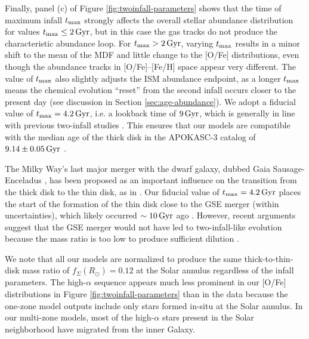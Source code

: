 \documentclass[twocolumn,twocolappendix,linenumbers]{aastex631}
\newcommand{\Gyr}{\,{\rm Gyr}}
\begin{document}
Finally, panel (c) of Figure \ref{fig:twoinfall-parameters} shows that the time of maximum infall $t_{\rm max}$ strongly affects the overall stellar abundance distribution for values $t_{\rm max}\leq2\Gyr$, but in this case the gas tracks do not produce the characteristic abundance loop. For $t_{\rm max}>2\Gyr$, varying $t_{\rm max}$ results in a minor shift to the mean of the MDF and little change to the [O/Fe] distributions, even though the abundance tracks in [O/Fe]--[Fe/H] space appear very different. The value of $t_{\rm max}$ also slightly adjusts the ISM abundance endpoint, as a longer $t_{\rm max}$ means the chemical evolution ``reset'' from the second infall occurs closer to the present day (see discussion in Section \ref{sec:age-abundance}). We adopt a fiducial value of $t_{\rm max}=4.2\Gyr$, i.e. a lookback time of $9\Gyr$, which is generally in line with previous two-infall studies \citep[e.g.,][]{nissen_high-precision_2020,spitoni_galactic_2020,spitoni_apogee_2021,hegedus_reconstructing_2025}. This ensures that our models are compatible with the median age of the thick disk in the APOKASC-3 catalog of $9.14\pm0.05\Gyr$ \citep{pinsonneault_apokasc-3_2025}. 

The Milky Way's last major merger with the dwarf galaxy, dubbed Gaia Sausage-Enceladus \citep[GSE;][]{belokurov_co-formation_2018,helmi_merger_2018}, has been proposed as an important influence on the transition from the thick disk to the thin disk, as in \citet{spitoni_remind_2024}. Our fiducial value of $t_{\rm max}=4.2\Gyr$ places the start of the formation of the thin disk close to the GSE merger (within uncertainties), which likely occurred $\sim10\Gyr$ ago \citep[e.g.,][]{helmi_merger_2018,gallart_uncovering_2019,naidu_reconstructing_2021,woody_rapid_2025}. However, recent arguments suggest that the GSE merger would not have led to two-infall-like evolution because the mass ratio is too low to produce sufficient dilution \citep{orkney_milky_2025}.

We note that all our models are normalized to produce the same thick-to-thin-disk mass ratio of $f_{\Sigma}(R_\odot)=0.12$ \citep{bland-hawthorn_galaxy_2016} at the Solar annulus regardless of the infall parameters. The high-$\alpha$ sequence appears much less prominent in our [O/Fe] distributions in Figure \ref{fig:twoinfall-parameters} than in the data because the one-zone model outputs include only stars formed in-situ at the Solar annulus. In our multi-zone models, most of the high-$\alpha$ stars present in the Solar neighborhood have migrated from the inner Galaxy.
\end{document}
